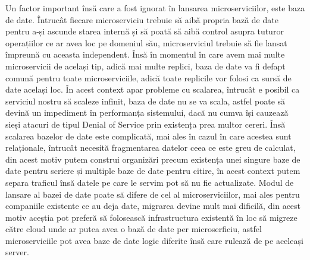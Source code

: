 Un factor important însă care a fost ignorat în lansarea microserviciilor, este baza de date.
Întrucât fiecare microserviciu trebuie să aibă propria bază de date pentru a-și ascunde starea
internă și să poată să aibă control asupra tuturor operațiilor ce ar avea loc pe 
domeniul său, microserviciul trebuie să fie lansat împreună cu aceasta independent. Însă 
în momentul în care avem mai multe microservicii de același tip, adică mai multe replici,
baza de date va fi defapt comună pentru toate microserviciile, adică toate replicile
vor folosi ca sursă de date același loc. În acest context apar probleme cu scalarea,
întrucât e posibil ca serviciul nostru să scaleze infinit, baza de date nu se va scala, 
astfel poate să devină un impediment în performanța sistemului, dacă nu cumva își cauzează
sieși atacuri de tipul Denial of Service prin existența prea multor cereri. Însă scalarea
bazelor de date este complicată, mai ales în cazul în care acestea sunt relaționale, întrucât
necesită fragmentarea datelor ceea ce este greu de calculat, din acest motiv putem 
construi organizări precum existența unei singure baze de date pentru scriere și multiple
baze de date pentru citire, în acest context putem separa traficul însă datele pe care le 
servim pot să nu fie actualizate. Modul de lansare al bazei de date poate să difere de cel
al microserviciilor, mai ales pentru companiile existente ce au deja date, migrarea devine
mult mai dificilă, din acest motiv aceștia pot preferă să folosească infrastructura existentă
în loc să migreze către cloud unde ar putea avea o bază de date per microserficiu, astfel microserviciile
pot avea baze de date logic diferite însă care rulează de pe aceleași server.

